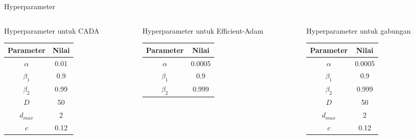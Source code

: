 \begin{frame}{Hyperparameter}
  \begin{columns}[b]
    \begin{column}{3.5cm}
      Hyperparameter untuk CADA \\
      \vspace{1cm}
      \begin{tabular}{ | c | c | }
        \hline
        \textbf{Parameter} & \textbf{Nilai} \\
        \hline
        $\alpha$           & 0.01           \\
        \hline
        $\beta_1$          & 0.9            \\
        \hline
        $\beta_2$          & 0.99           \\
        \hline
        $D$                & 50             \\
        \hline
        $d_{max}$          & 2              \\
        \hline
        $c$                & 0.12           \\
        \hline
      \end{tabular}
    \end{column}
    \begin{column}{3.5cm}
      Hyperparameter untuk Efficient-Adam \\
      \vspace{1cm}
      \begin{tabular}{ | c | c | }
        \hline
        \textbf{Parameter} & \textbf{Nilai} \\
        \hline
        $\alpha$           & 0.0005         \\
        \hline
        $\beta_1$          & 0.9            \\
        \hline
        $\beta_2$          & 0.999          \\
        \hline
      \end{tabular}
    \end{column}
    \begin{column}{3.5cm}
      Hyperparameter untuk gabungan \\
      \vspace{1cm}
      \begin{tabular}{ | c | c | }
        \hline
        \textbf{Parameter} & \textbf{Nilai} \\
        \hline
        $\alpha$           & 0.0005         \\
        \hline
        $\beta_1$          & 0.9            \\
        \hline
        $\beta_2$          & 0.999          \\
        \hline
        $D$                & 50             \\
        \hline
        $d_{max}$          & 2              \\
        \hline
        $c$                & 0.12           \\
        \hline
      \end{tabular}
    \end{column}
  \end{columns}
\end{frame}

